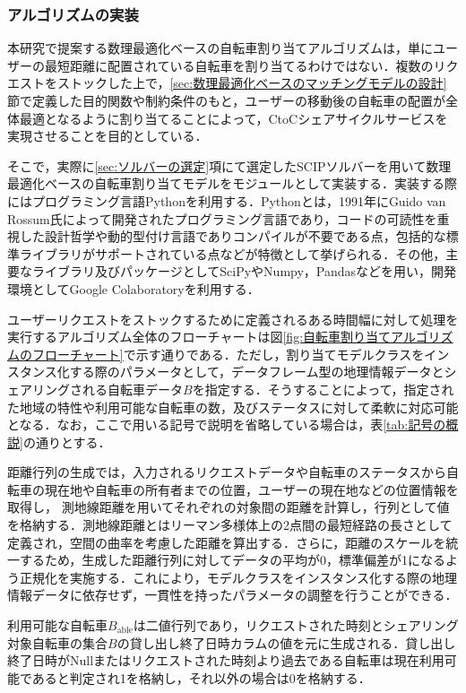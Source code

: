      \subsubsection{アルゴリズムの実装}
        \label{sec:アルゴリズムの実装}
          \par 本研究で提案する数理最適化ベースの自転車割り当てアルゴリズムは，単にユーザーの最短距離に配置されている自転車を割り当てるわけではない．複数のリクエストをストックした上で，\ref{sec:数理最適化ベースのマッチングモデルの設計}節で定義した目的関数や制約条件のもと，ユーザーの移動後の自転車の配置が全体最適となるように割り当てることによって，CtoCシェアサイクルサービスを実現させることを目的としている．
          \par そこで，実際に\ref{sec:ソルバーの選定}項にて選定したSCIPソルバーを用いて数理最適化ベースの自転車割り当てモデルをモジュールとして実装する．実装する際にはプログラミング言語Pythonを利用する．Pythonとは，1991年にGuido van Rossum氏によって開発されたプログラミング言語であり，コードの可読性を重視した設計哲学や動的型付け言語でありコンパイルが不要である点，包括的な標準ライブラリがサポートされている点などが特徴として挙げられる\cite{aboutPython}．その他，主要なライブラリ及びパッケージとしてSciPyやNumpy，Pandasなどを用い，開発環境としてGoogle Colaboratoryを利用する．
          \par ユーザーリクエストをストックするために定義されるある時間幅に対して処理を実行するアルゴリズム全体のフローチャートは図\ref{fig:自転車割り当てアルゴリズムのフローチャート}で示す通りである．ただし，割り当てモデルクラスをインスタンス化する際のパラメータとして，データフレーム型の地理情報データとシェアリングされる自転車データ$B$を指定する．そうすることによって，指定された地域の特性や利用可能な自転車の数，及びステータスに対して柔軟に対応可能となる．なお，ここで用いる記号で説明を省略している場合は，表\ref{tab:記号の概説}の通りとする．
          \par 距離行列の生成では，入力されるリクエストデータや自転車のステータスから自転車の現在地や自転車の所有者までの位置，ユーザーの現在地などの位置情報を取得し， 測地線距離を用いてそれぞれの対象間の距離を計算し，行列として値を格納する．測地線距離とはリーマン多様体上の2点間の最短経路の長さとして定義\cite{shuvo2024geodesic}され，空間の曲率を考慮した距離を算出する．さらに，距離のスケールを統一するため，生成した距離行列に対してデータの平均が0，標準偏差が1になるよう正規化を実施する．これにより，モデルクラスをインスタンス化する際の地理情報データに依存せず，一貫性を持ったパラメータの調整を行うことができる．
          \par 利用可能な自転車$B_{\text{able}}$は二値行列であり，リクエストされた時刻とシェアリング対象自転車の集合$B$の貸し出し終了日時カラムの値を元に生成される．貸し出し終了日時がNullまたはリクエストされた時刻より過去である自転車は現在利用可能であると判定され1を格納し，それ以外の場合は0を格納する．
